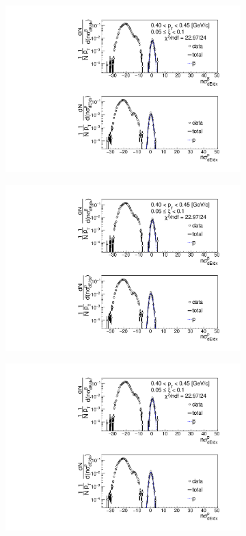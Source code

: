 \begin{figure}[h!]
\begin{subfigure}{.32\textwidth}
		\includegraphics[width=\linewidth, page=6]{chapters/chrgSTAR/img/dEdx/fit2019_thirdStep_2_1.pdf}
	\end{subfigure}
	\begin{subfigure}{.32\textwidth}
		\includegraphics[width=\linewidth, page=7]{chapters/chrgSTAR/img/dEdx/fit2019_thirdStep_2_1.pdf}
	\end{subfigure}
	\begin{subfigure}{.32\textwidth}
		\includegraphics[width=\linewidth, page=8]{chapters/chrgSTAR/img/dEdx/fit2019_thirdStep_2_1.pdf}

\end{subfigure}
\end{figure}
